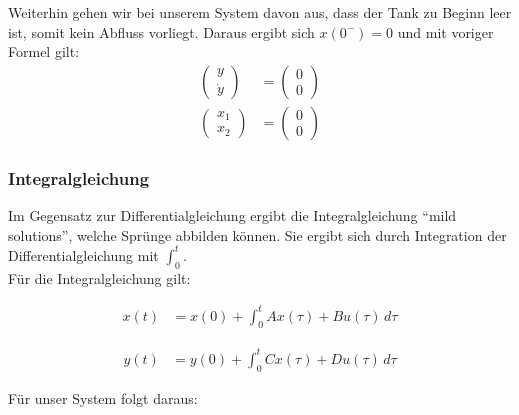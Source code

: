 Weiterhin gehen wir bei unserem System davon aus, dass der Tank zu Beginn leer ist, somit kein Abfluss vorliegt. Daraus ergibt sich $x(0^-) = 0$ und mit voriger Formel gilt:
\begin{align*}
    \left(\begin{array}{c} y \\ \dot y \end{array}\right) &= \left(\begin{array}{c}0\\0\end{array}\right) \\
    \left(\begin{array}{c} x_1 \\ x_2 \end{array}\right) &= \left(\begin{array}{c}0\\0\end{array}\right)
\end{align*}


\subsubsection{Integralgleichung}
Im Gegensatz zur Differentialgleichung ergibt die Integralgleichung \enquote{mild solutions}, welche Sprünge abbilden können. Sie ergibt sich durch Integration der Differentialgleichung mit $\int_{0}^{t}$. \\
Für die Integralgleichung gilt:

\noindent
\begin{minipage}{.5\linewidth}   
    \begin{align*}
        x(t) & = x(0) + \int_{0}^{t} Ax(\tau) + Bu(\tau)\,d\tau
    \end{align*}
\end{minipage}
\begin{minipage}{.5\linewidth}   
    \begin{align*}
        y(t) & = y(0) + \int_{0}^{t} Cx(\tau) + Du(\tau)\,d\tau
    \end{align*}
\end{minipage}

Für unser System folgt daraus:

